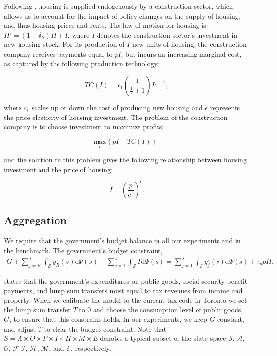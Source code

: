\documentclass[parskip=full]{article}
\begin{document}
Following \citet{rotberg-2022}, housing is supplied endogenously by a construction sector, which allows us to account for the impact of policy changes on the supply of housing, and thus housing prices and rents. The law of motion for housing is $H'=(1-\delta_h)H + I$, where $I$ denotes the construction sector's investment in new housing stock. For its production of $I$ new units of housing, the construction company receives payments equal to $pI$, but incurs an increasing marginal cost, as captured by the following production technology:

\begin{equation*}
TC(I)=c_{1}\left(\frac{1}{\frac{1}{\epsilon}+1}\right)I^{\frac{1}{\epsilon}+1}\label{eq:total_cost_structure},
\end{equation*}

\noindent where $c_1$ scales up or down the cost of producing new housing and $\epsilon$ represents the price elasticity of housing investment. The problem of the construction company is to choose investment to maximize profits:

\begin{equation*}
\label{eq:construction_company_profits}
\underset{I} {\text{$\mbox{max} $}}{\left\{p I-TC(I)\right\}},
\end{equation*}

\noindent and the solution to this problem gives the following relationship between housing investment and the price of housing:

\begin{equation}
\label{eq:construction_company_first_order_condition}
I=\left(\frac{p}{c_{1}}\right)^{\epsilon}.
\end{equation}

\subsection{Aggregation}\label{subsection:aggregation}

We require that the government's budget balance in all our experiments and in the benchmark. The government's budget constraint,
\begin{align}\label{eq:gbc}
  G + \sum_{j=R}^J \int_\mathcal{S} y_{R}(s) \mathrm{d}\Psi(s) + \sum_{j=1}^J \int_\mathcal{S} T \mathrm{d}\Psi(s) = \sum_{j=1}^J \int_\mathcal{S}y^{\tau}_{j}(s) \mathrm{d}\Psi(s)+\tau_p p H,
\end{align}

\noindent states that the government's expenditures on public goods, social security benefit payments, and lump sum transfers must equal to tax revenues from income and property. When we calibrate the model to the current tax code in Toronto we set the lump sum transfer $T$ to 0 and choose the consumption level of public goods, $G$, to ensure that this constraint holds. In our experiments, we keep $G$ constant, and adjust $T$ to clear the budget constraint. Note that $S=A\times O \times F \times I \times H \times M \times E$ denotes a typical subset of the state space $\mathcal{S}$, $\mathcal{A}$, $\mathcal{O}$, $\mathcal{F}$ $\mathcal{I}$, $\mathcal{H}$, $\mathcal{M}$, and $\mathcal{E}$, respectively.
\end{document}
